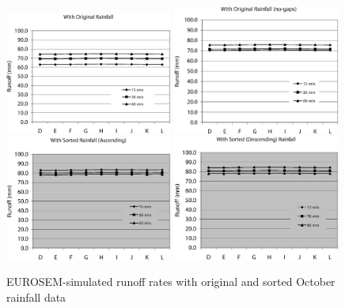 \begin{figure}[htbp]
  \centering
    \includegraphics[width=0.49\textwidth]{./img/eurosem_runoff_with_original}
    \includegraphics[width=0.49\textwidth]
{./img/eurosem_runoff_with_original_nogap}\\[5mm]
    \includegraphics[width=0.49\textwidth]{./img/eurosem_runoff_with_sorted_asc}
    \includegraphics[width=0.49\textwidth]{./img/eurosem_runoff_with_sorted_des}
  \caption{EUROSEM-simulated runoff rates with original and sorted October
rainfall data}
  \label{fig:eurosem_runoff_results}
\end{figure}

